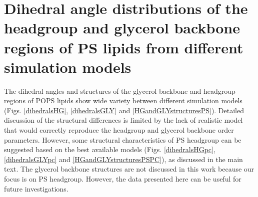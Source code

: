 \documentclass[journal=jpcbfk]{achemso}
\begin{document}
\pagebreak
\section{Dihedral angle distributions of the headgroup and glycerol backbone
  regions of PS lipids from different simulation models}\label{Diheds}

The dihedral angles and structures of the glycerol backbone and headgroup regions of POPS lipids show
wide variety between different simulation models (Figs. \ref{dihedralsHG}, \ref{dihedralsGLY} and \ref{HGandGLYstructuresPS}).
Detailed discussion of the structural differences is limited by the lack of realistic model that would correctly reproduce the
headgroup and glycerol backbone order parameters. However, some structural characteristics
of PS headgroup can be suggested based on the best available models
(Figs. \ref{dihedralsHGpc}, \ref{dihedralsGLYpc} and \ref{HGandGLYstructuresPSPC}), as discussed in the main text.
The glycerol backbone structures are not discussed in this work because our focus is on PS headgroup.
However, the data presented here can be useful for future investigations.
\end{document}
